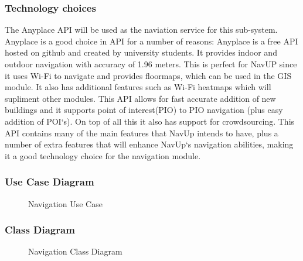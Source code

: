 \subsubsection{Technology choices}
	The Anyplace API will be used as the naviation service for this sub-system. Anyplace is a good 
	choice in API for a number of reasons: Anyplace is a free API hosted on github and created by 
	university students. It provides indoor and outdoor navigation with accuracy of 1.96 meters. 
	This is perfect for NavUP since it uses Wi-Fi to navigate and provides floormaps, which can be 
	used in the GIS module. It also has additional features such as Wi-Fi heatmaps which will 
	supliment other modules. This API allows for fast accurate addition of new buildings and it 
	supports point of interest(PIO) to PIO navigation (plus easy addition of POI`s). On top of all 
	this it also has support for crowdsourcing. This API contains many of the main features that NavUp
	 intends to have, plus a number of extra features that will enhance NavUp`s navigation abilities,
	  making it a good technology choice for the navigation module.

\subsubsection{Use Case Diagram}
	\begin{figure}[h!]
	\caption{Navigation Use Case}
	\end{figure}

\subsubsection{Class Diagram}
	\begin{figure}[h!]
	\caption{Navigation Class Diagram}
	\end{figure}

